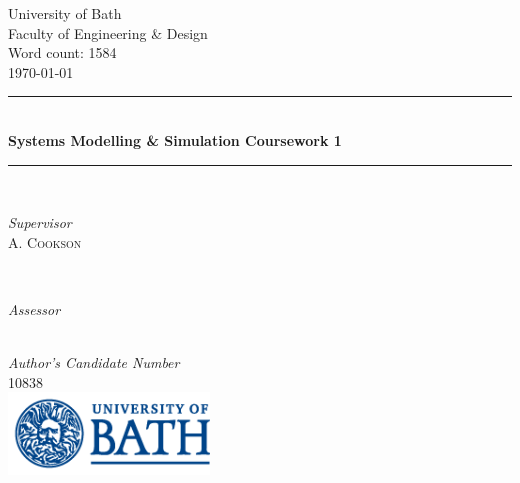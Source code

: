 \documentclass[11pt]{article}
\begin{document}
 

	\begin{titlepage}
	\thispagestyle{empty}
		\newcommand{\HRule}{\rule{\linewidth}{0.5mm}}	
		\center
		\LARGE 
		University of Bath\\
	 	Faculty of Engineering \& Design\\[1cm]	
		\large
		Word count: 1584\\[0.5cm]
		{\large\today}\\[1cm]	
		\HRule\\[0.4cm]	
		{\LARGE \bfseries Systems Modelling \& Simulation Coursework 1}\\[0.3cm] 	
		\HRule\\[1cm]	
		\begin{minipage}{0.4\textwidth}
			\begin{flushleft}
				\large
				\textit{Supervisor}\\
				A. \textsc{Cookson}
			\end{flushleft}
		\end{minipage}
		~
		\begin{minipage}{0.4\textwidth}
			\begin{flushright}
				\large
				\textit{Assessor}\\
				
			\end{flushright}
		\end{minipage}\\[1.4cm]
		\large
		\textit{Author's Candidate Number}\\
		10838\\
		\vfill
		\includegraphics[width=0.4\textwidth]{UOB_Logo.png}\\
		\vfill 
	\end{titlepage}




\thispagestyle{empty}




\tableofcontents
\thispagestyle{empty}
\listoffigures


\end{document}
